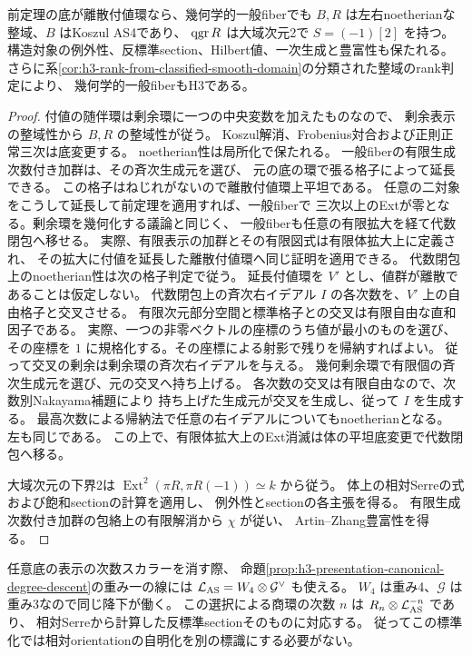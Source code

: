 \begin{corollary}\label{cor:h3-trait-homological-generization}
前定理の底が離散付値環なら、幾何学的一般fiberでも
$B,R$ は左右noetherianな整域、$B$ はKoszul AS4であり、
$\operatorname{qgr} R$ は大域次元2で $S=(-1)[2]$ を持つ。
構造対象の例外性、反標準section、Hilbert値、一次生成と豊富性も保たれる。
さらに系\ref{cor:h3-rank-from-classified-smooth-domain}の分類された整域のrank判定により、
幾何学的一般fiberもH3である。
\end{corollary}
\begin{proof}
付値の随伴環は剰余環に一つの中央変数を加えたものなので、
剰余表示の整域性から $B,R$ の整域性が従う。
Koszul解消、Frobenius対合および正則正常三次は底変更する。
noetherian性は局所化で保たれる。
一般fiberの有限生成次数付き加群は、その斉次生成元を選び、
元の底の環で張る格子によって延長できる。
この格子はねじれがないので離散付値環上平坦である。
任意の二対象をこうして延長して前定理を適用すれば、一般fiberで
三次以上のExtが零となる。剰余環を幾何化する議論と同じく、
一般fiberも任意の有限拡大を経て代数閉包へ移せる。
実際、有限表示の加群とその有限図式は有限体拡大上に定義され、
その拡大に付値を延長した離散付値環へ同じ証明を適用できる。
代数閉包上のnoetherian性は次の格子判定で従う。
延長付値環を $V'$ とし、値群が離散であることは仮定しない。
代数閉包上の斉次右イデアル $I$ の各次数を、$V'$ 上の自由格子と交叉させる。
有限次元部分空間と標準格子との交叉は有限自由な直和因子である。
実際、一つの非零ベクトルの座標のうち値が最小のものを選び、
その座標を $1$ に規格化する。その座標による射影で残りを帰納すればよい。
従って交叉の剰余は剰余環の斉次右イデアルを与える。
幾何剰余環で有限個の斉次生成元を選び、元の交叉へ持ち上げる。
各次数の交叉は有限自由なので、次数別Nakayama補題により
持ち上げた生成元が交叉を生成し、従って $I$ を生成する。
最高次数による帰納法で任意の右イデアルについてもnoetherianとなる。
左も同じである。
この上で、有限体拡大上のExt消滅は体の平坦底変更で代数閉包へ移る。

大域次元の下界2は
$\operatorname{Ext}^2(\pi R,\pi R(-1))\simeq k$ から従う。
体上の相対Serreの式および飽和sectionの計算を適用し、
例外性とsectionの各主張を得る。
有限生成次数付き加群の包絡上の有限解消から $\chi$ が従い、
Artin--Zhang豊富性を得る。
\end{proof}

\begin{remark}
任意底の表示の次数スカラーを消す際、
命題\ref{prop:h3-presentation-canonical-degree-descent}の重み一の線には
$\mathcal L_{\rm AS}=W_4\otimes\mathcal G^\vee$ も使える。
$W_4$ は重み4、$\mathcal G$ は重み3なので同じ降下が働く。
この選択による商環の次数 $n$ は $R_n\otimes\mathcal L_{\rm AS}^{-n}$ であり、
相対Serreから計算した反標準sectionそのものに対応する。
従ってこの標準化では相対orientationの自明化を別の標識にする必要がない。
\end{remark}

